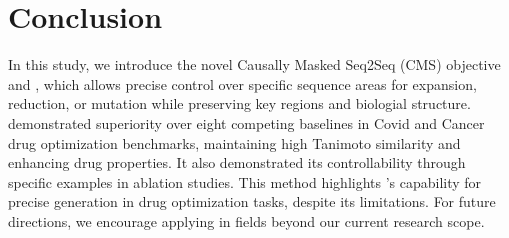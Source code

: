         
    
\section{Conclusion}\label{sec:con}




In this study, we introduce the novel Causally Masked Seq2Seq (CMS) objective and \algname, which allows precise control over specific sequence areas for expansion, reduction, or mutation while preserving key regions and biologial structure. \algname demonstrated superiority over eight competing baselines in Covid and Cancer drug optimization benchmarks, maintaining high Tanimoto similarity and enhancing drug properties. It also demonstrated its controllability through specific examples in ablation studies. This method highlights \algname's capability for precise generation in drug optimization tasks, despite its limitations. For future directions, we encourage applying \algname in fields beyond our current research scope.

